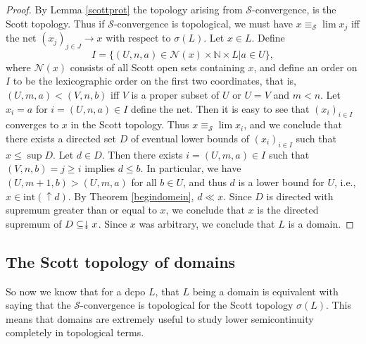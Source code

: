 \documentclass[a4paper,12pt]{article}
\newcommand{\downdownarrow}{\mathrel{\reflectbox{\rotatebox[origin=c]{90}{$\twoheadleftarrow$}}}}
\theoremstyle{definition}
\newcommand{\N}{{\mathbb N}}
\renewcommand{\int}{\text{int}}
\begin{document}
\begin{proof}
By Lemma \ref{scottprot} the topology arising from $\mathcal{S}$-convergence, is the Scott topology. Thus if $\mathcal{S}$-convergence is topological, we must have $x \equiv_{\mathcal{S}} \lim x_j$ iff the net $(x_j)_{j\in J} \rightarrow x$ with respect to $\sigma(L)$. Let $x \in L$. Define $$I = \{(U,n,a) \in \mathcal{N}(x) \times \N \times L | a \in U\},$$
where $\mathcal{N}(x)$ consists of all Scott open sets containing $x$, and define an order on $I$ to be the lexicographic order on the first two coordinates, that is, $(U, m, a) < (V, n, b)$ iff $V$ is a proper subset of $U$ or $U = V$ and $m < n$. Let $x_i = a$ for $i = (U, n, a) \in I$ define the net. Then it is easy to see that $(x_i)_{i \in I}$ converges to $x$ in the Scott topology. Thus $x \equiv_\mathcal{S} \lim x_i$, and we conclude that there exists a directed set $D$ of eventual lower bounds of $(x_i)_{i\in I}$ such that $x \leq \sup D$. Let $d \in D$. Then there exists $i = (U, m, a) \in I$ such that $(V, n, b) = j \geq i$ implies $d \leq b$. In particular, we have $(U, m + 1, b) > (U, m, a)$ for all $b \in U$, and thus $d$ is a lower bound for $U$, i.e., $x \in \int(\uparrow d)$. By Theorem \ref{begindomein}, $d \ll x$. Since $D$ is directed with supremum greater than or equal to $x$, we conclude that $x$ is the directed supremum of $D \subseteq \downdownarrow x$. Since $x$ was arbitrary, we conclude that $L$ is a domain.
\end{proof}

\subsection{The Scott topology of domains}
So now we know that for a dcpo $L$, that $L$ being a domain is equivalent with saying that the $\mathcal{S}$-convergence is topological for the Scott topology $\sigma(L)$. This means that domains are extremely useful to study lower semicontinuity completely in topological terms.
\end{document}
